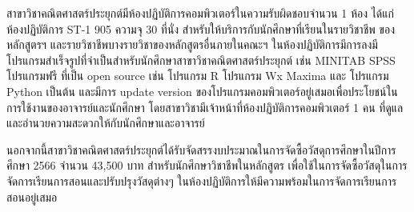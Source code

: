 สาขาวิชาคณิตศาสตร์ประยุกต์มีห้องปฏิบัติการคอมพิวเตอร์ในความรับผิดชอบจำนวน 1 ห้อง ได้แก่ ห้องปฏิบัติการ ST-1 905 ความจุ 30 ที่นั่ง สำหรับให้บริการกับนักศึกษาที่เรียนในรายวิชาชีพ ของหลักสูตรฯ และรายวิชาชีพบางรายวิชาของหลักสูตรอื่นภายในคณะฯ ในห้องปฏิบัติการมีการลงมีโปรแกรมสำเร็จรูปที่จำเป็นสำหรับนักศึกษาสาขาวิชาคณิตศาสตร์ประยุกต์ เช่น MINITAB  SPSS โปรแกรมฟรี ที่เป็น open source เช่น โปรแกรม R  โปรแกรม Wx Maxima และ โปรแกรม Python เป็นต้น และมีการ update version ของโปรแกรมคอมพิวเตอร์อยู่เสมอเพื่อประโยชน์ในการใช้งานของอาจารย์และนักศึกษา โดยสาขาวิชามีเจ้าหน้าที่ห้องปฏิบัติการคอมพิวเตอร์ 1 คน ที่ดูแลและอำนวยความสะดวกให้กับนักศึกษาและอาจารย์ 

นอกจากนี้สาขาวิชาคณิตศาสตร์ประยุกต์ได้รับจัดสรรงบประมาณในการจัดซื้อวัสดุการศึกษาในปีการศึกษา 2566 จำนวน 43,500 บาท สำหรับนักศึกษาวิชาชีพในหลักสูตร เพื่อใช้ในการจัดซื้อวัสดุในการจัดการเรียนการสอนและปรับปรุงวัสดุต่างๆ ในห้องปฏิบัติการให้มีความพร้อมในการจัดการเรียนการสอนอยู่เสมอ



\begin{doclist}
\end{doclist}


